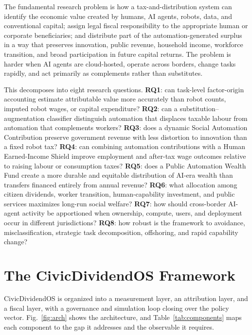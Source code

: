 \documentclass[journal]{IEEEtran}
\theoremstyle{plain}
\theoremstyle{definition}
\begin{document}
The fundamental research problem is how a tax-and-distribution system can identify the economic value created by humans, AI agents, robots, data, and conventional capital; assign legal fiscal responsibility to the appropriate human or corporate beneficiaries; and distribute part of the automation-generated surplus in a way that preserves innovation, public revenue, household income, workforce transition, and broad participation in future capital returns. The problem is harder when AI agents are cloud-hosted, operate across borders, change tasks rapidly, and act primarily as complements rather than substitutes.

This decomposes into eight research questions. \textbf{RQ1}: can task-level factor-origin accounting estimate attributable value more accurately than robot counts, imputed robot wages, or capital expenditure? \textbf{RQ2}: can a substitution--augmentation classifier distinguish automation that displaces taxable labour from automation that complements workers? \textbf{RQ3}: does a dynamic Social Automation Contribution preserve government revenue with less distortion to innovation than a fixed robot tax? \textbf{RQ4}: can combining automation contributions with a Human Earned-Income Shield improve employment and after-tax wage outcomes relative to raising labour or consumption taxes? \textbf{RQ5}: does a Public Automation Wealth Fund create a more durable and equitable distribution of AI-era wealth than transfers financed entirely from annual revenue? \textbf{RQ6}: what allocation among citizen dividends, worker transition, human-capability investment, and public services maximizes long-run social welfare? \textbf{RQ7}: how should cross-border AI-agent activity be apportioned when ownership, compute, users, and deployment occur in different jurisdictions? \textbf{RQ8}: how robust is the framework to avoidance, misclassification, strategic task decomposition, offshoring, and rapid capability change?

\section{The CivicDividendOS Framework}
\label{sec:framework}

CivicDividendOS is organized into a measurement layer, an attribution layer, and a fiscal layer, with a governance and simulation loop closing over the policy vector. Fig.~\ref{fig:arch} shows the architecture, and Table~\ref{tab:components} maps each component to the gap it addresses and the observable it requires.
\end{document}
